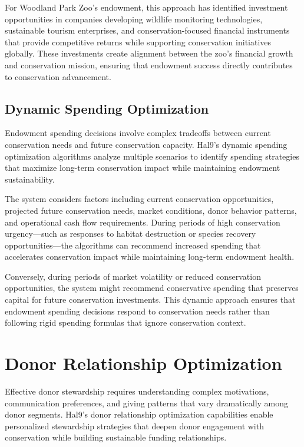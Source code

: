 \documentclass[
  Letterpaper,
]{scrbook}
\begin{document}
For Woodland Park Zoo's endowment, this approach has identified
investment opportunities in companies developing wildlife monitoring
technologies, sustainable tourism enterprises, and conservation-focused
financial instruments that provide competitive returns while supporting
conservation initiatives globally. These investments create alignment
between the zoo's financial growth and conservation mission, ensuring
that endowment success directly contributes to conservation advancement.

\subsection{Dynamic Spending
Optimization}\label{dynamic-spending-optimization}

Endowment spending decisions involve complex tradeoffs between current
conservation needs and future conservation capacity. Hal9's dynamic
spending optimization algorithms analyze multiple scenarios to identify
spending strategies that maximize long-term conservation impact while
maintaining endowment sustainability.

The system considers factors including current conservation
opportunities, projected future conservation needs, market conditions,
donor behavior patterns, and operational cash flow requirements. During
periods of high conservation urgency---such as responses to habitat
destruction or species recovery opportunities---the algorithms can
recommend increased spending that accelerates conservation impact while
maintaining long-term endowment health.

Conversely, during periods of market volatility or reduced conservation
opportunities, the system might recommend conservative spending that
preserves capital for future conservation investments. This dynamic
approach ensures that endowment spending decisions respond to
conservation needs rather than following rigid spending formulas that
ignore conservation context.

\section{Donor Relationship
Optimization}\label{donor-relationship-optimization}

Effective donor stewardship requires understanding complex motivations,
communication preferences, and giving patterns that vary dramatically
among donor segments. Hal9's donor relationship optimization
capabilities enable personalized stewardship strategies that deepen
donor engagement with conservation while building sustainable funding
relationships.
\end{document}
